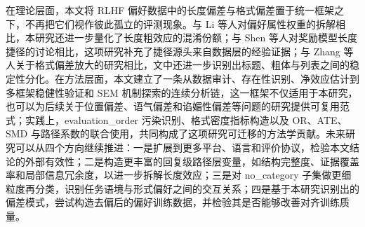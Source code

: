 \documentclass[9pt,a4paper,fontset=windows]{ctexart}
\theoremstyle{definition}
\numberwithin{equation}{section}
\begin{document}
在理论层面，本文将 RLHF 偏好数据中的长度偏差与格式偏差置于统一框架之下，不再把它们视作彼此孤立的评测现象。与 Li 等人对偏好属性权重的拆解相比，本研究还进一步量化了长度粗效应的混淆份额；与 Shen 等人对奖励模型长度捷径的讨论相比，这项研究补充了捷径源头来自数据层的经验证据；与 Zhang 等人关于格式偏差放大的研究相比，文中还进一步识别出标题、粗体与列表之间的稳定性分化。在方法层面，本文建立了一条从数据审计、存在性识别、净效应估计到多框架稳健性验证和 SEM 机制探索的连续分析链，这一框架不仅适用于本研究，也可以为后续关于位置偏差、语气偏差和谄媚性偏差等问题的研究提供可复用范式；实践上，evaluation\_order 污染识别、格式密度指标构造以及 OR、ATE、SMD 与路径系数的联合使用，共同构成了这项研究可迁移的方法学贡献。未来研究可以从四个方向继续推进：一是扩展到更多平台、语言和评价协议，检验本文结论的外部有效性；二是构造更丰富的回复级路径层变量，如结构完整度、证据覆盖率和局部信息冗余度，以进一步拆解长度效应；三是对 no\_category 子集做更细粒度再分类，识别任务语境与形式偏好之间的交互关系；四是基于本研究识别出的偏差模式，尝试构造去偏后的偏好训练数据，并检验其是否能够改善对齐训练质量。
\end{document}
